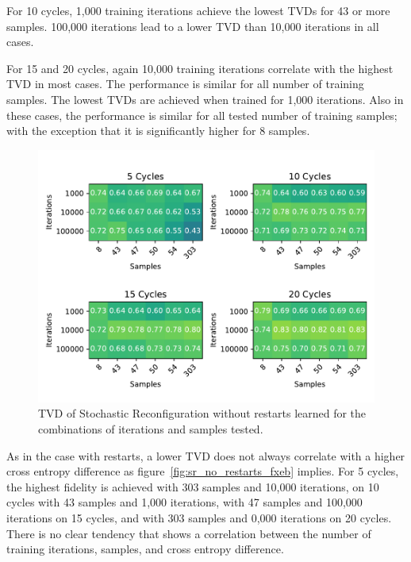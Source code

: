 For 10 cycles, 1,000 training iterations achieve the lowest TVDs for 43 or more samples. 
100,000 iterations lead to a lower TVD than 10,000 iterations in all cases. 

For 15 and 20 cycles, again 10,000 training iterations correlate with the highest TVD in most cases.
The performance is similar for all number of training samples. The lowest TVDs are achieved when trained for 1,000
iterations. Also in these cases, the performance is similar for all tested number of training samples; with 
the exception that it is significantly higher for 8 samples.

\begin{figure}[H]
  \centering
  \includegraphics[width=\textwidth]{figures/results/SR-no-restarts-learned/tvd_heatmap.pdf}
  \caption[TVD of RBMs Trained with Stochastic Reconfiguration without Random Restarts and $CZ$ Gates Learned]{TVD of Stochastic 
  Reconfiguration without restarts learned for the combinations of iterations and samples tested.}
  \label{fig:sr_no_restarts_tvd}
\end{figure}

As in the case with restarts, a lower TVD does not always correlate with a higher cross entropy difference as 
figure~\ref{fig:sr_no_restarts_fxeb}
implies. For 5 cycles, the highest fidelity is achieved with 303 samples and 10,000 iterations, on 10 cycles 
with 43 samples and 1,000 iterations, with 47 samples and 100,000 iterations on 15 cycles, and with 303 samples and 
0,000 iterations on 20 cycles. There is no clear tendency that shows a correlation between 
the number of training iterations, samples, and cross entropy difference.

